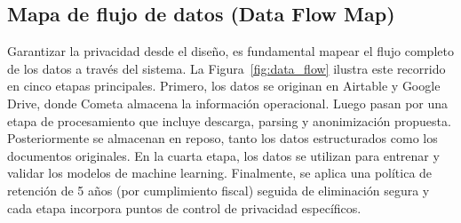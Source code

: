 \subsection{Mapa de flujo de datos (Data Flow Map)}

Garantizar la privacidad desde el diseño, es fundamental mapear el flujo completo de los datos a través del sistema. La Figura~\ref{fig:data_flow} ilustra este recorrido en cinco etapas principales. Primero, los datos se originan en Airtable y Google Drive, donde Cometa almacena la información operacional. Luego pasan por una etapa de procesamiento que incluye descarga, parsing y anonimización propuesta. Posteriormente se almacenan en reposo, tanto los datos estructurados como los documentos originales. En la cuarta etapa, los datos se utilizan para entrenar y validar los modelos de machine learning. Finalmente, se aplica una política de retención de 5 años (por cumplimiento fiscal) seguida de eliminación segura y cada etapa incorpora puntos de control de privacidad específicos.

